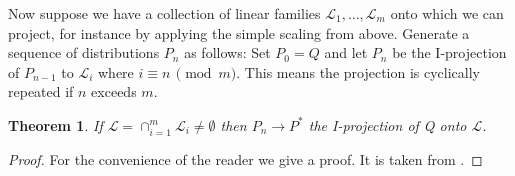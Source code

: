\documentclass[12pt]{amsart}
\theoremstyle{plain}%
\newtheorem{thm}{Theorem}
\theoremstyle{definition}
\theoremstyle{remark}
\begin{document}
Now suppose we have a collection of linear families
$\mathcal{L}_1,\ldots,\mathcal{L}_m $ onto which we can project, for
instance by applying the simple scaling from above. Generate a
sequence of distributions $P_n$ as follows: Set $P_0 = Q$ and let
$P_n$ be the I-projection of $P_{n-1}$ to $\mathcal{L}_i$ where $i
\equiv n\, \pmod m$. This means the projection is cyclically repeated
if $n$ exceeds $m$.

\begin{thm}
\label{sec:iterartiveprojectiontheorem}
  If $\mathcal{L} = \cap_{i=1}^m \mathcal{L}_i \neq \emptyset$ then $P_n \to P^*$ the I-projection of Q onto $\mathcal{L}$. 
\end{thm}
\begin{proof} For the convenience of the reader we give a proof. It is
  taken from \cite{csiszarshields04}.


\end{proof}
\end{document}
